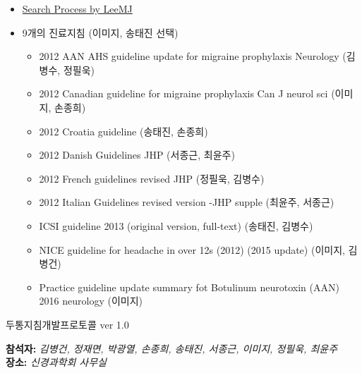 \documentclass[idxtotoc,hyperref,openany, oneside]{labbook} %
\newcommand{\attend}[1]{\textbf{참석자:} \emph{#1}\\}
\newcommand{\place}[1]{\textbf{장소:} \emph{#1}\\}
\begin{document}
	\begin{itemize}
		\item \href{RefFiles/20170112/searchingProcess20170112LeeMJ}{Search Process by LeeMJ}
		\item 9개의 진료지침 (이미지, 송태진 선택)
		\begin{itemize}
			\item 2012 AAN AHS guideline update for migraine prophylaxis Neurology (김병수, 정필욱)
			\item 2012 Canadian guideline for migraine prophylaxis Can J neurol sci (이미지, 손종희)
			\item 2012 Croatia guideline (송태진, 손종희)
			\item 2012 Danish Guidelines JHP (서종근, 최윤주)
			\item 2012 French guidelines revised JHP (정필욱, 김병수)
			\item 2012 Italian Guidelines revised version -JHP supple (최윤주, 서종근) 
			\item ICSI guideline 2013 (original version, full-text) (송태진, 김병수)
			\item NICE guideline for headache in over 12s (2012) (2015 update) (이미지, 김병건)
			\item Practice guideline update summary fot Botulinum neurotoxin (AAN) 2016 neurology (이미지)
		\end{itemize}
	\end{itemize}
	
	두통지침개발프로토콜 ver 1.0
	
\attend{김병건, 정재면, 박광열, 손종희, 송태진, 서종근, 이미지, 정필욱, 최윤주}
\place{신경과학회 사무실}
\end{document}
